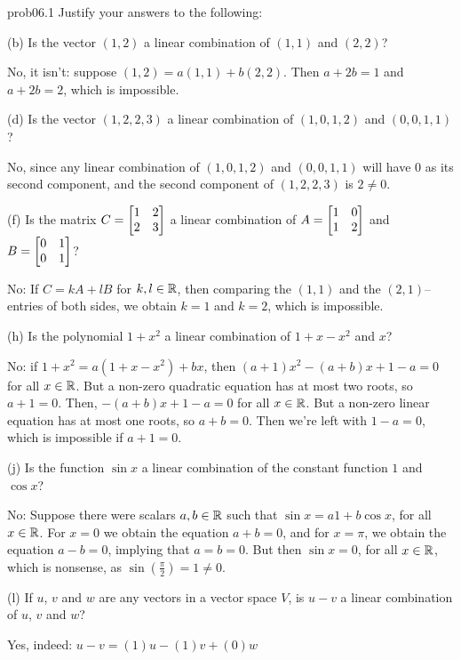 
\begin{sol}{prob06.1} Justify your answers to the following:
\medskip

(b) Is the vector $(1,2)$ a linear combination of $(1,1)$ and $(2,2)$? 

\soln No, it isn't: suppose $(1,2)=a(1,1)+b(2,2)$. Then $a+2b=1$ and $a+2b=2$, which is impossible. 
\medskip

(d) Is the vector $(1,2,2,3)$ a linear combination of $(1,0,1,2)$ and $(0,0,1,1)$?

\soln No, since any linear combination of $(1,0,1,2)$ and $(0,0,1,1)$ will have $0$ as its second component, and the second component of $(1,2,2,3)$ is $2 \not=0$.
\medskip
%

(f) Is the matrix $C=\bmatrix 1&2\\2&3\endbmatrix $ a linear combination of $A=\bmatrix 1&0\\1&2\endbmatrix$ and $B= \bmatrix 0&1\\0&1\endbmatrix $?

\soln No: If $C=k A +lB$ for $k,l \in \mathbb{R}$, then comparing the $(1,1)$ and the $(2,1)$--entries of both sides, we obtain $k=1$ and $k=2$, which is impossible. 
\medskip
%

(h) Is the polynomial $1+x^2$ a linear combination of $1+x-x^2$ and $x$?  

\soln No: if $1+x^2 =a(1+x-x^2)+bx$, then $(a+1)x^2-(a+b)x +1-a=0$  for all $x\in \mathbb{R}$. But a non-zero quadratic equation has at most two roots, so    $a+1=0$. Then, $-(a+b)x +1-a=0$  for all $x\in \mathbb{R}$. But a non-zero linear equation has at most one roots, so $a+b=0$. Then we're left with $1-a=0$, which is impossible if $a+1=0$.  
\medskip

(j) Is the function $\sin x$ a linear combination of the constant function $1$ and $\cos x$?

\soln No: Suppose there were scalars $a,b \in \mathbb{R}$ such that $\sin x =a1+b\cos x$, for all $x\in \mathbb{R}$. For $x=0$ we obtain the equation $a+b=0$, and for $x=\pi$, we obtain the equation $a-b=0$, implying that $a=b=0$. But then $\sin x =0$, for all $x\in \mathbb{R}$, which is nonsense, as $\sin(\frac{\pi}2)=1\not=0$.
\medskip

(l) If $u$, $v$ and $w$ are any vectors in  a vector space $V$, is $u-v$ a linear combination of $u$, $v$ and $w$?

\soln Yes, indeed: $u-v =(1) u -(1) v + (0) w$
\medskip

\end{sol}

